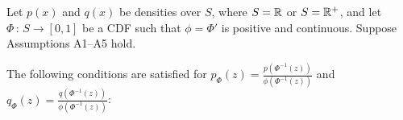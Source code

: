 \documentclass{article}
\begin{document}
\begin{proposition}
\label{prop:transformation1}
Let $p(x)$ and $q(x)$ be densities over $S$, where $S = {\mathbb R}$ or $S = {\mathbb R}^+$, and let $\Phi \,:\, S \rightarrow [0,1]$ be a CDF such that $\phi = \Phi'$ is positive and continuous. Suppose Assumptions A1--A5 hold.





The following conditions are satisfied for $p_\Phi(z) = \frac{p(\Phi^{-1}(z))}{\phi(\Phi^{-1}(z))}$ and $q_\Phi(z) = \frac{q(\Phi^{-1}(z))}{\phi(\Phi^{-1}(z))}$:


\end{proposition}
\end{document}
